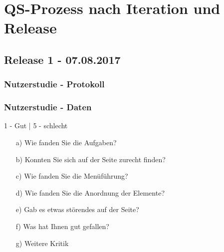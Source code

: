 \documentclass[accentcolor=tud0b,12pt,paper=a4]{tudreport}
\begin{document}
\chapter{QS-Prozess nach Iteration und Release}














\pagebreak
\section{Release 1 - 07.08.2017}

	\subsection*{Nutzerstudie - Protokoll}
	
	
	\subsection*{Nutzerstudie - Daten}
	\begin{adjustbox}{max width=\textwidth}
	\end{adjustbox}
	\newline
	\begin{footnotesize} 1 - Gut | 5 - schlecht \end{footnotesize}
	\begin{itemize}
		\item[a)] Wie fanden Sie die Aufgaben?
		\item[b)] Konnten Sie sich auf der Seite zurecht finden?
		\item[c)] Wie fanden Sie die Menüführung?
		\item[d)] Wie fanden Sie die Anordnung der Elemente?
		\item[e)] Gab es etwas störendes auf der Seite?
		\item[f)] Was hat Ihnen gut gefallen?
		\item[g)] Weitere Kritik
	\end{itemize}
\end{document}
